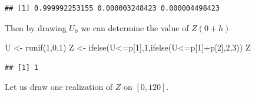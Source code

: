 \documentclass[a4paper,10pt,openany]{book}
\newenvironment{Shaded}{\begin{snugshade}}{\end{snugshade}}
\newcommand{\DecValTok}[1]{\textcolor[rgb]{0.00,0.00,0.81}{#1}}
\newcommand{\FunctionTok}[1]{\textcolor[rgb]{0.00,0.00,0.00}{#1}}
\newcommand{\NormalTok}[1]{#1}
\newcommand{\OtherTok}[1]{\textcolor[rgb]{0.56,0.35,0.01}{#1}}
\newcommand{\SpecialCharTok}[1]{\textcolor[rgb]{0.00,0.00,0.00}{#1}}
\begin{document}
\begin{verbatim}
## [1] 0.999992253155 0.000003248423 0.000004498423
\end{verbatim}

Then by drawing \(U_0\) we can determine the value of \(Z(0+h)\)

\begin{Shaded}
\begin{Highlighting}[]
\NormalTok{U }\OtherTok{\textless{}{-}} \FunctionTok{runif}\NormalTok{(}\DecValTok{1}\NormalTok{,}\DecValTok{0}\NormalTok{,}\DecValTok{1}\NormalTok{)}
\NormalTok{Z }\OtherTok{\textless{}{-}} \FunctionTok{ifelse}\NormalTok{(U}\SpecialCharTok{\textless{}=}\NormalTok{p[}\DecValTok{1}\NormalTok{],}\DecValTok{1}\NormalTok{,}\FunctionTok{ifelse}\NormalTok{(U}\SpecialCharTok{\textless{}=}\NormalTok{p[}\DecValTok{1}\NormalTok{]}\SpecialCharTok{+}\NormalTok{p[}\DecValTok{2}\NormalTok{],}\DecValTok{2}\NormalTok{,}\DecValTok{3}\NormalTok{))}
\NormalTok{Z}
\end{Highlighting}
\end{Shaded}

\begin{verbatim}
## [1] 1
\end{verbatim}

Let us draw one realization of \(Z\) on \([0,120]\).
\end{document}
